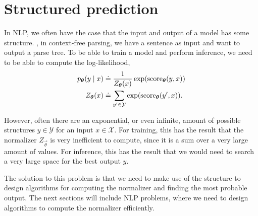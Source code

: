 \section{Structured prediction}

In NLP, we often have the case that the input and output of a model has some
structure. \Eg, in context-free parsing, we have a sentence as input and want
to output a parse tree. To be able to train a model and perform inference, we
need to be able to compute the log-likelihood,
\begin{align*}
    p_{\bm{\theta}}(y \mid x) & \doteq \frac{1}{Z_{\bm{\theta}}(x)} \exp(\mathrm{score}_{\bm{\theta}}(y,x)) \\
    Z_{\bm{\theta}}(x)        & \doteq \sum_{y' \in \mathcal{Y}} \exp(\mathrm{score}_{\bm{\theta}}(y',x)).
\end{align*}

However, often there are an exponential, or even infinite, amount of possible
structures $y\in\mathcal{Y}$ for an input $x\in\mathcal{X}$. For training, this
has the result that the normalizer $Z_{\vec{\theta}}$ is very inefficient to
compute, since it is a sum over a very large amount of values. For inference,
this has the result that we would need to search a very large space for the
best output $y$.

The solution to this problem is that we need to make use of the structure to
design algorithms for computing the normalizer and finding the most probable
output. The next sections will include NLP problems, where we need to design
algorithms to compute the normalizer efficiently.
